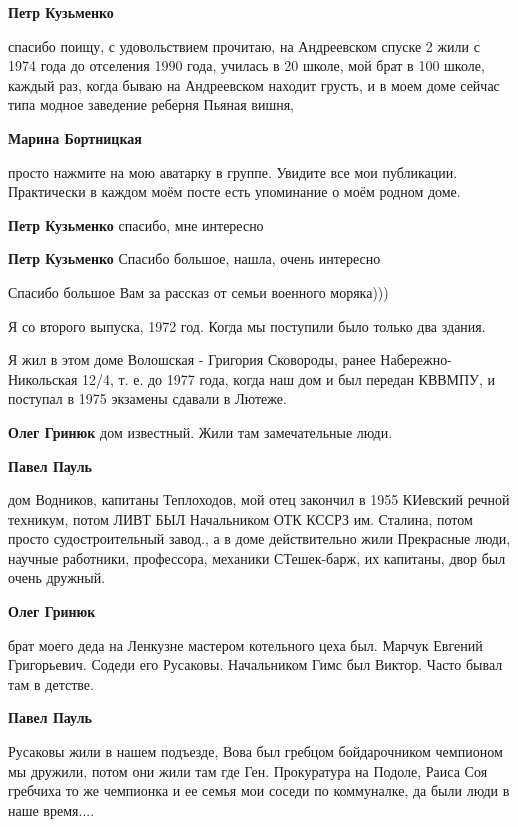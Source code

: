 \begin{itemize}
\begin{itemize}
\textbf{Петр Кузьменко} 

спасибо поищу, с удовольствием прочитаю, на Андреевском спуске 2 жили с 1974 года
до отселения 1990 года, училась в 20 школе, мой брат в 100 школе, каждый раз, когда
бываю на Андреевском находит грусть, и в моем доме сейчас типа модное заведение
реберня Пьяная вишня,

\textbf{Марина Бортницкая} 

просто нажмите на мою аватарку в группе. Увидите все мои публикации.
Практически в каждом моём посте есть упоминание о моём родном доме.

\textbf{Петр Кузьменко} спасибо, мне интересно

\textbf{Петр Кузьменко} Спасибо большое, нашла, очень интересно
\end{itemize} %

Спасибо большое Вам за рассказ от семьи военного моряка)))

Я со второго выпуска, 1972 год. Когда мы поступили было только два здания.


Я жил в этом доме Волошская - Григория Сковороды, ранее
Набережно-Никольская 12/4, т. е. до 1977 года, когда наш дом и был передан КВВМПУ, и
поступал в 1975 экзамены сдавали в Лютеже.

\begin{itemize} %
\textbf{Олег Гринюк} дом известный. Жили там замечательные люди.

\textbf{Павел Пауль} 

дом Водников, капитаны Теплоходов, мой отец закончил в 1955 КИевский речной
техникум, потом ЛИВТ БЫЛ Начальником ОТК КССРЗ им. Сталина, потом просто
судостроительный завод., а в доме действительно жили Прекрасные люди, научные
работники, профессора, механики СТешек-барж, их капитаны, двор был очень дружный.


\textbf{Олег Гринюк} 

брат моего деда на Ленкузне мастером котельного цеха был. Марчук Евгений
Григорьевич. Содеди его Русаковы. Начальником Гимс был Виктор. Часто бывал там
в детстве.


\textbf{Павел Пауль} 

Русаковы жили в нашем подъезде, Вова был гребцом бойдарочником чемпионом мы
дружили, потом они жили там где Ген. Прокуратура на Подоле, Раиса Соя гребчиха то
же чемпионка и ее семья мои соседи по коммуналке, да были люди в наше время....



\end{itemize}
\end{itemize}
